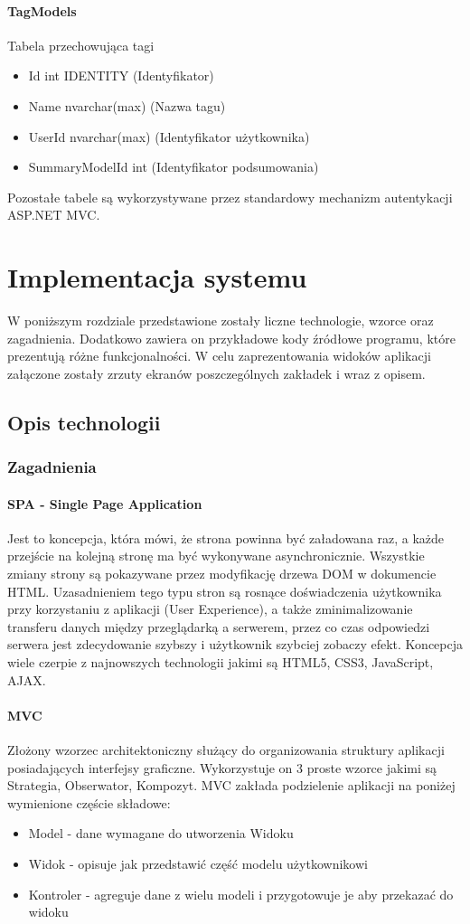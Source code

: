 \documentclass[10pt,titlepage]{article}
\begin{document}
\paragraph[short]{TagModels}
Tabela przechowująca tagi
\begin{itemize}
  \item Id int IDENTITY (Identyfikator)
  \item Name nvarchar(max) (Nazwa tagu)
  \item UserId nvarchar(max) (Identyfikator użytkownika)
  \item SummaryModelId int (Identyfikator podsumowania)
\end{itemize}
Pozostałe tabele są wykorzystywane przez standardowy mechanizm autentykacji ASP.NET MVC.
\section{Implementacja systemu}
W poniższym rozdziale przedstawione zostały liczne technologie, wzorce oraz zagadnienia. Dodatkowo zawiera on przykładowe kody źródłowe programu, które prezentują różne funkcjonalności. W celu zaprezentowania widoków aplikacji załączone zostały zrzuty ekranów poszczególnych zakładek i wraz z opisem.
\subsection{Opis technologii}
\subsubsection{Zagadnienia}
\paragraph{SPA - Single Page Application}
Jest to koncepcja, która mówi, że strona powinna być załadowana raz, a każde przejście na kolejną stronę ma być wykonywane asynchronicznie. Wszystkie zmiany strony są pokazywane przez modyfikację drzewa DOM w dokumencie HTML. Uzasadnieniem tego typu stron są rosnące doświadczenia użytkownika przy korzystaniu z aplikacji (User Experience), a także zminimalizowanie transferu danych między przeglądarką a serwerem, przez co czas odpowiedzi serwera jest zdecydowanie szybszy i użytkownik szybciej zobaczy efekt. Koncepcja wiele czerpie z najnowszych technologii jakimi są HTML5, CSS3, JavaScript, AJAX.
\paragraph{MVC}
Złożony wzorzec architektoniczny służący do organizowania struktury aplikacji posiadających interfejsy graficzne. Wykorzystuje on 3 proste wzorce jakimi są Strategia, Obserwator, Kompozyt.\linebreak
MVC zakłada podzielenie aplikacji na poniżej wymienione częście składowe:
\begin{itemize}
  \item Model - dane wymagane do utworzenia Widoku
  \item Widok - opisuje jak przedstawić część modelu użytkownikowi
  \item Kontroler - agreguje dane z wielu modeli i przygotowuje je aby przekazać do widoku
\end{itemize}
\end{document}
